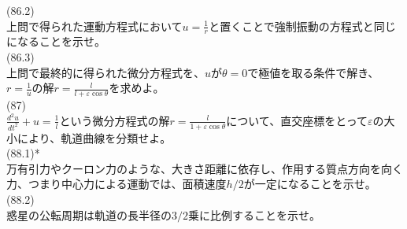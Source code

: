 \documentclass{jsarticle}
\begin{document}
(86.2)\\
上問で得られた運動方程式において\(u=\frac{1}{r}\)と置くことで強制振動の方程式と同じになることを示せ。\\
(86.3)\\
上問で最終的に得られた微分方程式を、\(u\)が\(\theta=0\)で極値を取る条件で解き、\(r=\frac{1}{u}\)の解\(\displaystyle r=\frac{l}{l+\varepsilon\cos\theta}\)を求めよ。\\
(87)\\
\(\displaystyle\frac{d^{2}u}{dt^{2}}+u=\frac{1}{l}\)という微分方程式の解\(\displaystyle r=\frac{l}{1+\varepsilon\cos\theta}\)について、直交座標をとって\(\varepsilon\)の大小により、軌道曲線を分類せよ。\\
(88.1)*\\
万有引力やクーロン力のような、大きさ距離に依存し、作用する質点方向を向く力、つまり中心力による運動では、面積速度\(h/2\)が一定になることを示せ。\\
(88.2)\\
惑星の公転周期は軌道の長半径の\(3/2\)乗に比例することを示せ。\\
\end{document}
